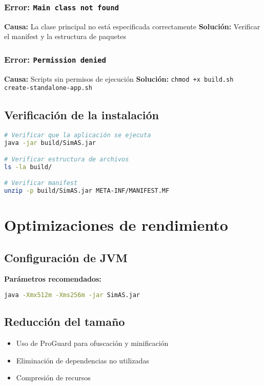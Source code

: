 \subsubsection{Error: \texttt{Main class not found}}
\textbf{Causa:} La clase principal no está especificada correctamente
\textbf{Solución:} Verificar el manifest y la estructura de paquetes

\subsubsection{Error: \texttt{Permission denied}}
\textbf{Causa:} Scripts sin permisos de ejecución
\textbf{Solución:} \texttt{chmod +x build.sh create-standalone-app.sh}

\subsection{Verificación de la instalación}

\begin{lstlisting}[language=bash, caption=Verificación de la instalación]
# Verificar que la aplicación se ejecuta
java -jar build/SimAS.jar

# Verificar estructura de archivos
ls -la build/

# Verificar manifest
unzip -p build/SimAS.jar META-INF/MANIFEST.MF
\end{lstlisting}

\section{Optimizaciones de rendimiento}

\subsection{Configuración de JVM}

\textbf{Parámetros recomendados:}
\begin{lstlisting}[language=bash, caption=Parámetros JVM optimizados]
java -Xmx512m -Xms256m -jar SimAS.jar
\end{lstlisting}

\subsection{Reducción del tamaño}

\begin{itemize}
    \item Uso de ProGuard para ofuscación y minificación
    \item Eliminación de dependencias no utilizadas
    \item Compresión de recursos
\end{itemize}

